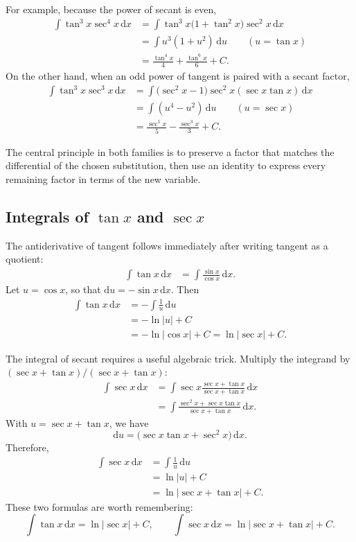 For example, because the power of secant is even,
\begin{align*}
    \int\tan^3x\sec^4x\,\mathrm{d}x
    &=\int\tan^3x\bigl(1+\tan^2x\bigr)\sec^2x\,\mathrm{d}x \\
    &=\int u^3(1+u^2)\,\mathrm{d}u
        \qquad (u=\tan x)\\
    &=\frac{\tan^4x}{4}+\frac{\tan^6x}{6}+C.
\end{align*}
On the other hand, when an odd power of tangent is paired with a secant
factor,
\begin{align*}
    \int\tan^3x\sec^3x\,\mathrm{d}x
    &=\int\bigl(\sec^2x-1\bigr)\sec^2x
        (\sec x\tan x)\,\mathrm{d}x \\
    &=\int(u^4-u^2)\,\mathrm{d}u
        \qquad (u=\sec x)\\
    &=\frac{\sec^5x}{5}-\frac{\sec^3x}{3}+C.
\end{align*}

The central principle in both families is to preserve a factor that matches
the differential of the chosen substitution, then use an identity to express
every remaining factor in terms of the new variable.

\subsection{Integrals of \(\tan x\) and \(\sec x\)}

The antiderivative of tangent follows immediately after writing tangent as a
quotient:
\begin{align*}
    \int\tan x\,\mathrm{d}x
    &=\int\frac{\sin x}{\cos x}\,\mathrm{d}x.
\end{align*}
Let \(u=\cos x\), so that \(\mathrm{d}u=-\sin x\,\mathrm{d}x\).  Then
\begin{align*}
    \int\tan x\,\mathrm{d}x
    &=-\int\frac{1}{u}\,\mathrm{d}u \\
    &=-\ln|u|+C \\
    &=-\ln|\cos x|+C
      =\ln|\sec x|+C.
\end{align*}

The integral of secant requires a useful algebraic trick.  Multiply the
integrand by \((\sec x+\tan x)/(\sec x+\tan x)\):
\begin{align*}
    \int\sec x\,\mathrm{d}x
    &=\int\sec x
      \frac{\sec x+\tan x}{\sec x+\tan x}\,\mathrm{d}x \\
    &=\int\frac{\sec^2x+\sec x\tan x}
                    {\sec x+\tan x}\,\mathrm{d}x.
\end{align*}
With \(u=\sec x+\tan x\), we have
\[
    \mathrm{d}u
    =\bigl(\sec x\tan x+\sec^2x\bigr)\,\mathrm{d}x.
\]
Therefore,
\begin{align*}
    \int\sec x\,\mathrm{d}x
    &=\int\frac{1}{u}\,\mathrm{d}u \\
    &=\ln|u|+C \\
    &=\ln|\sec x+\tan x|+C.
\end{align*}
These two formulas are worth remembering:
\[
    \boxed{\int\tan x\,\mathrm{d}x=\ln|\sec x|+C},
    \qquad
    \boxed{\int\sec x\,\mathrm{d}x
        =\ln|\sec x+\tan x|+C}.
\]

